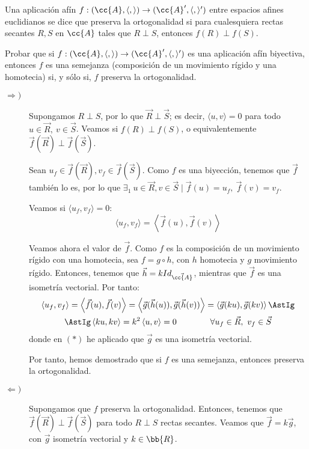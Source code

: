 \begin{ejercicio}
    Una aplicación afín $f : (\cc{A}, \langle , \rangle) \to (\cc{A}', \langle , \rangle')$ entre espacios afines euclidianos se dice que preserva la ortogonalidad si para cualesquiera rectas secantes $R, S$ en $\cc{A}$ tales que $R \perp S$, entonces $f({R}) \perp f(S)$.

    Probar que si $f : (\cc{A}, \langle , \rangle) \to (\cc{A}', \langle , \rangle')$ es una aplicación afín biyectiva, entonces $f$ es una semejanza (composición de un movimiento rígido y una homotecia) si, y sólo si, $f$ preserva la ortogonalidad.

    \begin{description}
        \item[$\Longrightarrow)$] Supongamos $R\perp S$, por lo que $\vec{R}\perp \vec{S}$; es decir, $\langle u,v\rangle = 0$ para todo $u\in \vec{R},~v\in \vec{S}$. Veamos si $f(R)\perp f(S)$, o equivalentemente $\vec{f}(\vec{R})\perp \vec{f}(\vec{S})$.

        Sean $u_f\in \vec{f}(\vec{R}), v_f\in \vec{f}(\vec{S})$. Como $f$ es una biyección, tenemos que $\vec{f}$ también lo es, por lo que $\exists_1~u\in \vec{R}, v\in \vec{S}\mid \vec{f}(u) = u_f,~\vec{f}(v) = v_f$.

        Veamos si $\langle u_f,v_f\rangle = 0$:
        \begin{equation*}
            \langle u_f, v_f\rangle = \left\langle\vec{f}(u), \vec{f}(v)\right\rangle
        \end{equation*}

        Veamos ahora el valor de $\vec{f}$. Como $f$ es la composición de un movimiento rígido con una homotecia, sea $f=g\circ h$, con $h$ homotecia y $g$ movimiento rígido. Entonces, tenemos que $\vec{h}=kId_{\vec{\cc{A}}}$, mientras que $\vec{f}$ es una isometría vectorial. Por tanto:
        \begin{multline*}
            \left\langle u_f, v_f\right\rangle = \left\langle \vec{f}(u), \vec{f}(v)\right\rangle
            = \left\langle \vec{g}(\vec{h}(u)), \vec{g}(\vec{h}(v))\right\rangle
            = \left\langle \vec{g}(ku), \vec{g}(kv)\right\rangle
            \AstIg\\\AstIg \left\langle ku, kv\right\rangle = k^2\left\langle u, v\right\rangle = 0 \qquad \qquad \forall u_f\in \vec{R},~v_f\in \vec{S}
        \end{multline*} 
        donde en $(\ast)$ he aplicado que $\vec{g}$ es una isometría vectorial.

        Por tanto, hemos demostrado que si $f$ es una semejanza, entonces preserva la ortogonalidad.

        \item[$\Longleftarrow)$] Supongamos que $f$ preserva la ortogonalidad. Entonces, tenemos que $\vec{f}(\vec{R})\perp \vec{f}(\vec{S})$ para todo $R\perp S$ rectas secantes.
        Veamos que $\vec{f}=k \vec{g}$, con $\vec{g}$ isometría vectorial y $k\in \bb{R}$.

    \end{description}
\end{ejercicio}


